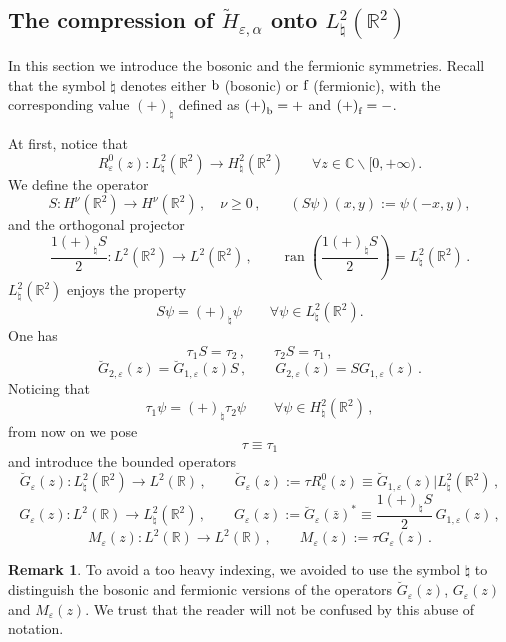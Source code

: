 \documentclass[a4paper,11pt,reqno]{amsart}
\theoremstyle{definition}
\newtheorem{remark}[theorem]{Remark}
\numberwithin{equation}{section}
\newcommand{\ran}{\operatorname{ran }}
\newcommand{\CO}{\mathbb C}
\newcommand{\RE}{\mathbb R}
\newcommand{\ve}{\varepsilon}
\newcommand{\bos}{\text{\rm b}}
\newcommand{\fer}{\text{\rm f}}
\newcommand{\bosfer}{{\natural}}
\newcommand{\bosferpm}{{(+)}}
\newcommand{\be}{\begin{equation}}
\newcommand{\ee}{\end{equation}}
\begin{document}
\subsection{The compression of \texorpdfstring{$\widetilde H_{\ve,\alpha }$\label{ss:2.2}}{Hve} onto 
$L^{2}_{\bosfer}(\RE^{2})$} \label{ss:resolvent} In this section we introduce the bosonic and the fermionic symmetries. Recall that the symbol $\bosfer$ denotes either $\bos$ (bosonic) or $\fer$ (fermionic), with the corresponding value $\bosferpm_\bosfer$ defined as $\bosferpm_\bos = +$ and $\bosferpm_\fer = -$.\par
At first, notice that 
\be\label{inv}
R^{0}_{\ve}(z) : L^2_{\bosfer}(\RE^2) \to H^2_{\bosfer}(\RE^2) \qquad \forall z\in\CO\backslash [0,+\infty)\,.
\ee
We define the operator  
\begin{equation}\label{SS1}
S: H^{\nu}(\RE^2) \to  H^{\nu}(\RE^2) \,,\quad \nu\ge 0\,,\qquad
(S\psi)(x,y) := \psi(-x,y),
\end{equation}
and the orthogonal projector 
\begin{equation}\label{SS2}
\frac{1\bosferpm_\bosfer S}2: L^{2}(\RE^{2})\to L^{2}(\RE^{2})\,,\qquad \ran\left(\frac{1\bosferpm_\bosfer S}2\right)=L^{2}_{\bosfer}(\RE^{2})\,.
\end{equation}
$L^{2}_{\bosfer}(\RE^{2})$ enjoys the property  
\[
S\psi = \bosferpm_\bosfer\psi \qquad \forall \psi \in L^2_{\bosfer}(\RE^2). 
\]
One has 
\[
\tau_{1}S=\tau_{2}\,,\qquad \tau_{2}S=\tau_{1}\,,
\]
\[ 
 \breve G_{2,\ve}(z) =  \breve G_{1,\ve}(z) S \,,\qquad  G_{2,\ve}(z) = SG_{1,\ve}(z)\,.
\]
Noticing that
\[
\tau_{1} \psi=\bosferpm_\bosfer\tau_{2}\psi  \qquad \forall  \psi\in  H^2_{\bosfer}(\RE^2)\,,
\]
from now on we pose 
\[\tau\equiv\tau_{1}\]
and introduce the bounded operators
\[%
\breve G_{\ve}(z):L^{2}_{\bosfer}(\RE^{2})\to L^{2}(\RE)\,,\qquad
\breve G_{\ve}(z):=\tau R_{\ve}^{0}(z)\equiv\breve G_{1,\ve}(z)|L^{2}_{\bosfer}(\RE^{2})\,,
\]
\[%
G_{\ve}(z):L^{2}(\RE)\to L^{2}_{\bosfer}(\RE^{2})\,,\qquad G_{\ve}(z):=\breve G_{\ve}(\bar z)^{*}\equiv
\frac{1 \bosferpm_\bosfer S}2\,G_{1,\ve}(z)
\,,
\]
\[
M_{\ve}(z):L^{2}(\RE)\to L^{2}(\RE)\,,\qquad M_{\ve}(z):=\tau G_{\ve}(z)\,.
\]
\begin{remark} To avoid a too heavy indexing,  we avoided to use the symbol $\bosfer$ to distinguish the bosonic and fermionic versions of the operators $\breve G_{\ve}(z)$, $G_{\ve}(z)$ and $M_{\ve}(z)$. We trust that the reader will not be confused by this abuse of notation.
\end{remark} 
\end{document}
